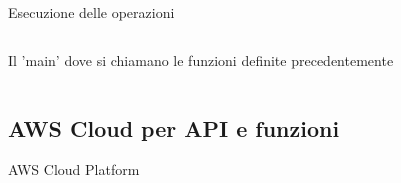 \documentclass[xcolor=svgnames, aspectratio=169]{beamer}
\begin{document}
\begin{frame}{Esecuzione delle operazioni}
    \begin{columns}[t]
        Il 'main' dove si chiamano le funzioni definite precedentemente
        
        \vspace*{-32pt}
        \begin{figure}[H]
            \centering
            \noindent{}
        \end{figure}
    \end{columns}
\end{frame}


\subsection{AWS Cloud per API e funzioni}

\begin{frame}{AWS Cloud Platform}
    \vspace*{-56pt}
    \begin{figure}[H]
        \centering
        \noindent{}
    \end{figure}
\end{frame}
\end{document}
